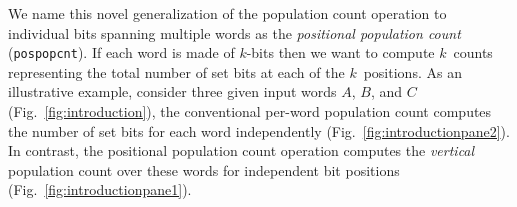 \documentclass[AMA,STIX1COL]{WileyNJD-v2}
\begin{document}
\begin{table}
\caption{Example of a one-hot encoding.} \centering
{}
\end{table}

We name this novel generalization of the population count operation to individual bits spanning multiple words %
as the \textit{positional population count} (\texttt{pospopcnt}). If each word is made of $k$-bits then we want to compute $k$~counts representing the total number of set bits at each of the $k$~positions. As an illustrative example, consider three given input words $A$, $B$, and $C$ (Fig.~\ref{fig:introduction}), the conventional per-word population count computes the number of set bits for each word independently (Fig.~\ref{fig:introductionpane2}). In contrast, the positional population count operation computes the \emph{vertical} population count over these words for independent bit positions (Fig.~\ref{fig:introductionpane1}).  
\end{document}
